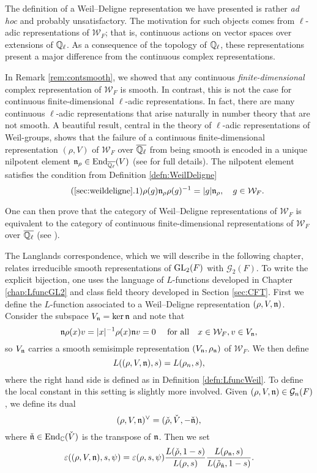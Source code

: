 \begin{rem}
    The definition of a Weil--Deligne representation we have presented is rather \textit{ad hoc} and probably unsatisfactory. The motivation for such objects comes from $\ell$-adic representations of $\mathcal{W}_F$; that is, continuous actions on vector spaces over extensions of $\mathbb{Q}_\ell$. As a consequence of the topology of $\mathbb{Q}_\ell$, these representations present a major difference from the continuous complex representations. 

    In Remark \ref{rem:contsmooth}, we showed that any continuous \textit{finite-dimensional} complex representation of $\mathcal{W}_F$ is smooth. In contrast, this is not the case for continuous finite-dimensional $\ell$-adic representations. In fact, there are many continuous $\ell$-adic representations that arise naturally in number theory that are not smooth. A beautiful result, central in the theory of $\ell$-adic representations of Weil-groups, shows that the failure of a continuous finite-dimensional representation $(\rho,V)$ of $\mathcal{W}_F$ over $\overline{\mathbb{Q}_\ell}$ from being smooth is encoded in a unique nilpotent element $\mathfrak{n}_\rho\in\mathrm{End}_{\overline{\mathbb{Q}_\ell}}(V)$ (see \cite[32.5 Theorem]{BH1} for full details). The nilpotent element satisfies the condition from Definition \ref{defn:WeilDeligne}
    \begin{equation}\label{eqn:Vnsubspace}\tag{\ref{sec:weildeligne}.1}
        \rho(g)\nn_\rho\rho(g)^{-1}=|g|\nn_\rho,\quad g\in \mathcal{W}_F.
    \end{equation}

    One can then prove that the category of Weil--Deligne representations of $\mathcal{W}_F$ is equivalent to the category of continuous finite-dimensional representations of $\mathcal{W}_F$ over $\overline{\mathbb{Q}_\ell}$ (see \cite[32.6 Theorem]{BH1}). 
\end{rem}

The Langlands correspondence, which we will describe in the following chapter, relates irreducible smooth representations of $\mathrm{GL}_2(F)$ with $\mathcal{G}_2(F)$. To write the explicit bijection, one uses the language of $L$-functions developed in Chapter \ref{chap:LfuncGL2} and class field theory developed in Section \ref{sec:CFT}.
First we define the $L$-function associated to a Weil--Deligne representation $(\rho,V,\mathfrak{n})$. Consider the subspace $V_{\mathfrak{n}}=\ker\mathfrak{n}$ and note that 
$$\mathfrak{n}\rho(x)v=|x|^{-1}\rho(x)\mathfrak{n} v=0\quad\text{ for all}\quad x\in \mathcal{W}_F,v\in V_{\mathfrak{n}},$$
so $V_{\mathfrak{n}}$ carries a smooth semisimple representation $(V_{\mathfrak{n}},\rho_{\mathfrak{n}})$ of $\mathcal{W}_F$. We then define 
$$L((\rho,V,\mathfrak{n}),s)=L(\rho_n,s),$$
where the right hand side is defined as in Definition \ref{defn:LfuncWeil}. To define the local constant in this setting is slightly more involved. Given $(\rho,V,\mathfrak{n})\in\mathcal{G}_n(F)$, we define its dual
$$(\rho,V,\mathfrak{n})^\vee=(\check\rho,\check{V},-\check{\mathfrak{n}}),$$
where $\check{\mathfrak{n}}\in\mathrm{End}_{\mathbb{C}}(\check{V})$ is the transpose of $\mathfrak{n}$. Then we set
$$\varepsilon((\rho,V,\mathfrak{n}),s,\psi)=\varepsilon(\rho,s,\psi)\frac{L(\check{\rho},1-s)}{L(\rho,s)}\frac{L(\rho_{\mathfrak{n}},s)}{L(\check{\rho}_{\check{\mathfrak{n}}},1-s)}.$$

\newpage

